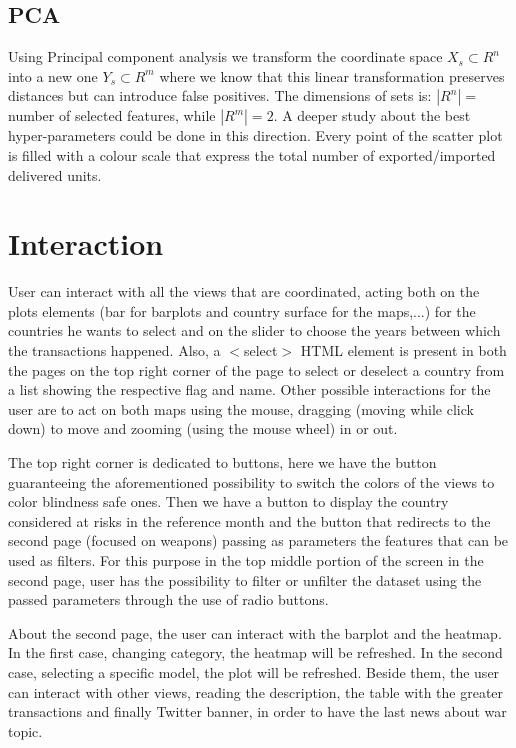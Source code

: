 \documentclass{article}
\begin{document}
\begin{multicols}{2}
\subsection{PCA}
Using Principal component analysis we transform the coordinate space $X_s \subset R^n$ into a new one $Y_s \subset R^m$ where we know that this linear transformation preserves distances but can introduce false positives. The dimensions of sets is: $|R^n|=$ number of selected features, while $|R^m|=2$.
A deeper study about the best hyper-parameters could be done in this direction. 
Every point of the scatter plot is filled with a colour scale that express the total number of exported/imported delivered units.

\section{Interaction}
User can interact with all the views 
that are coordinated, acting both on the plots elements (bar for barplots and country surface for the maps,...) for the countries he wants to select and on the slider to choose the years between which the transactions happened.
Also, a $<$select$>$ HTML element is present in both the pages on the top right corner of the page to select or deselect a country from a list showing the respective flag and name. Other possible interactions for the user are to act on both maps using the mouse, dragging (moving while click down) to move and zooming (using the mouse wheel) in or out. 

The top right corner is dedicated to buttons, here we have the
button guaranteeing the aforementioned possibility to switch the colors of the views to color blindness safe ones. Then we have a button to display the country considered at risks in the reference month and the button that redirects to the second page (focused on weapons) passing as parameters the features that can be used as filters.
For this purpose in the top middle portion of the screen in the second page, user has the possibility to filter or unfilter the dataset using the passed parameters through the use of radio buttons.

About the second page, the user can interact with the barplot and the heatmap. In the first case, changing category, the heatmap will be refreshed. In the second case, selecting a specific model, the plot will be refreshed. Beside them, the user can interact with other views, reading the description, the table with the greater transactions and finally Twitter banner, in order to have the last news about war topic.



\end{multicols}
\end{document}
